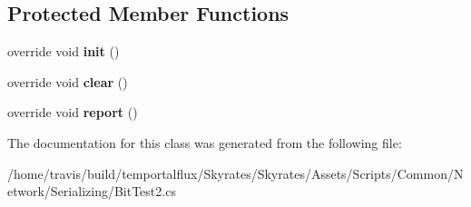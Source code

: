 \subsection*{Protected Member Functions}
\begin{DoxyCompactItemize}
\item 
\hypertarget{class_skyrates_1_1_common_1_1_network_1_1_test_1_1_bit_test2_a27ec922a75591f6c34861f5c56646afa}{override void {\bfseries init} ()}\label{class_skyrates_1_1_common_1_1_network_1_1_test_1_1_bit_test2_a27ec922a75591f6c34861f5c56646afa}

\item 
\hypertarget{class_skyrates_1_1_common_1_1_network_1_1_test_1_1_bit_test2_aee23b7a573203d2d136f39145429baab}{override void {\bfseries clear} ()}\label{class_skyrates_1_1_common_1_1_network_1_1_test_1_1_bit_test2_aee23b7a573203d2d136f39145429baab}

\item 
\hypertarget{class_skyrates_1_1_common_1_1_network_1_1_test_1_1_bit_test2_a1d2b7472b2a52f3c1471f7aedc905837}{override void {\bfseries report} ()}\label{class_skyrates_1_1_common_1_1_network_1_1_test_1_1_bit_test2_a1d2b7472b2a52f3c1471f7aedc905837}

\end{DoxyCompactItemize}


The documentation for this class was generated from the following file\-:\begin{DoxyCompactItemize}
\item 
/home/travis/build/temportalflux/\-Skyrates/\-Skyrates/\-Assets/\-Scripts/\-Common/\-Network/\-Serializing/Bit\-Test2.\-cs\end{DoxyCompactItemize}
